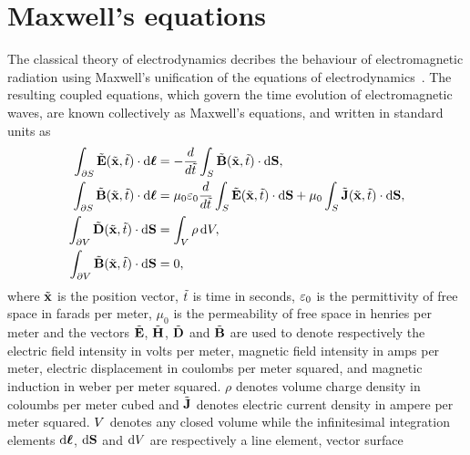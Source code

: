 \section{Maxwell's equations}
The classical theory of electrodynamics decribes the behaviour of
electromagnetic radiation using Maxwell's unification of the equations of
electrodynamics~\cite{Balanis:ui,Jackson:490457}. The resulting coupled
equations, which govern the time evolution of electromagnetic waves, are known
collectively as Maxwell's equations, and written in standard units as
\begin{subequations}
  \begin{align}
    \int_{\partial S} \tilde{\mathbf{E}}(\tilde{\mathbf{x}},\tilde{t}) \cdot \mathrm{d}\boldsymbol{\ell}  &= - \frac{d }{d \tilde{t}} \int_{S} \tilde{\mathbf{B}}(\tilde{\mathbf{x}},\tilde{t}) \cdot \mathrm{d}\mathbf{S}, \label{eq:maxwell-faraday-integral} \\
    \int_{\partial S} \tilde{\mathbf{B}}(\tilde{\mathbf{x}},\tilde{t}) \cdot \mathrm{d}\boldsymbol{\ell} &= \mu_0 \varepsilon_0 \frac{d }{d \tilde{t}} \int_{S} \tilde{\mathbf{E}}(\tilde{\mathbf{x}},\tilde{t}) \cdot \mathrm{d}\mathbf{S} +  \mu_0 \int_{S} \tilde{\mathbf{J}}(\tilde{\mathbf{x}},\tilde{t}) \cdot \mathrm{d}\mathbf{S}, \label{eq:maxwell-ampere-integral} \\
    \int_{\partial V} \tilde{\mathbf{D}}(\tilde{\mathbf{x}},\tilde{t})\cdot\mathrm{d}\mathbf{S} &= \int_V \rho \,\mathrm{d}V, \label{eq:maxwell-gauss-integral} \\
    \int_{\partial V} \tilde{\mathbf{B}}(\tilde{\mathbf{x}},\tilde{t})\cdot\mathrm{d}\mathbf{S} &= 0, \label{eq:maxwell-gauss-magnetism-integral}
  \end{align}
\end{subequations}
where $\tilde{\mathbf{x}}$ is the position vector, $\tilde{t}$ is time in seconds, $\varepsilon_0$
is the permittivity of free space in farads per meter, $\mu_0$ is the
permeability of free space in henries per meter and the vectors $\tilde{\mathbf{E}}$,
$\tilde{\mathbf{H}}$, $\tilde{\mathbf{D}}$ and $\tilde{\mathbf{B}}$ are used to denote respectively the electric
field intensity in volts per meter, magnetic field intensity in amps per meter,
electric displacement in coulombs per meter squared, and magnetic induction in
weber per meter squared. $\rho$ denotes volume charge density in coloumbs per
meter cubed and $\tilde{\mathbf{J}}$ denotes electric current density in ampere per meter
squared.
$V$ denotes any closed volume while the infinitesimal integration elements
$\mathrm{d}\boldsymbol{\ell}$, $\mathrm{d}\mathbf{S}$ and $\mathrm{d}V$ are respectively a line element, vector surface
